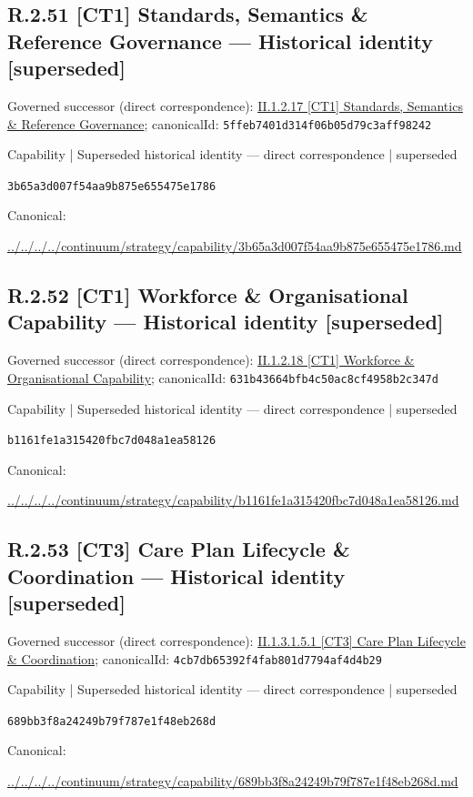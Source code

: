 \documentclass[10pt,a4paper]{article}
\begin{document}
\subsection*{R.2.51 [CT1] Standards, Semantics \& Reference Governance — Historical identity [superseded]}
Governed successor (direct correspondence): \hyperref[element-5ffeb7401d314f06b05d79c3aff98242]{II.1.2.17 [CT1] Standards, Semantics \& Reference Governance}; canonicalId: \texttt{5ffeb7401d314f06b05d79c3aff98242}\par
\label{element-3b65a3d007f54aa9b875e655475e1786}
{\small Capability | Superseded historical identity — direct correspondence | superseded}\par
\texttt{3b65a3d007f54aa9b875e655475e1786}\par
Canonical: \par
{\footnotesize\url{../../../../continuum/strategy/capability/3b65a3d007f54aa9b875e655475e1786.md}}\par
\subsection*{R.2.52 [CT1] Workforce \& Organisational Capability — Historical identity [superseded]}
Governed successor (direct correspondence): \hyperref[element-631b43664bfb4c50ac8cf4958b2c347d]{II.1.2.18 [CT1] Workforce \& Organisational Capability}; canonicalId: \texttt{631b43664bfb4c50ac8cf4958b2c347d}\par
\label{element-b1161fe1a315420fbc7d048a1ea58126}
{\small Capability | Superseded historical identity — direct correspondence | superseded}\par
\texttt{b1161fe1a315420fbc7d048a1ea58126}\par
Canonical: \par
{\footnotesize\url{../../../../continuum/strategy/capability/b1161fe1a315420fbc7d048a1ea58126.md}}\par
\subsection*{R.2.53 [CT3] Care Plan Lifecycle \& Coordination — Historical identity [superseded]}
Governed successor (direct correspondence): \hyperref[element-4cb7db65392f4fab801d7794af4d4b29]{II.1.3.1.5.1 [CT3] Care Plan Lifecycle \& Coordination}; canonicalId: \texttt{4cb7db65392f4fab801d7794af4d4b29}\par
\label{element-689bb3f8a24249b79f787e1f48eb268d}
{\small Capability | Superseded historical identity — direct correspondence | superseded}\par
\texttt{689bb3f8a24249b79f787e1f48eb268d}\par
Canonical: \par
{\footnotesize\url{../../../../continuum/strategy/capability/689bb3f8a24249b79f787e1f48eb268d.md}}\par
\end{document}

